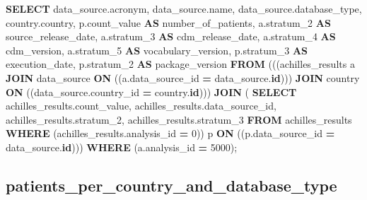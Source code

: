 \documentclass[
]{book}
\newenvironment{Shaded}{\begin{snugshade}}{\end{snugshade}}
\newcommand{\DecValTok}[1]{\textcolor[rgb]{0.00,0.00,0.81}{#1}}
\newcommand{\KeywordTok}[1]{\textcolor[rgb]{0.13,0.29,0.53}{\textbf{#1}}}
\newcommand{\NormalTok}[1]{#1}
\newcommand{\OperatorTok}[1]{\textcolor[rgb]{0.81,0.36,0.00}{\textbf{#1}}}
\begin{document}
\begin{Shaded}
\begin{Highlighting}[]
\KeywordTok{SELECT}\NormalTok{ data\_source.acronym,}
\NormalTok{   data\_source.name,}
\NormalTok{   data\_source.database\_type,}
\NormalTok{   country.country,}
\NormalTok{   p.count\_value }\KeywordTok{AS}\NormalTok{ number\_of\_patients,}
\NormalTok{   a.stratum\_2 }\KeywordTok{AS}\NormalTok{ source\_release\_date,}
\NormalTok{   a.stratum\_3 }\KeywordTok{AS}\NormalTok{ cdm\_release\_date,}
\NormalTok{   a.stratum\_4 }\KeywordTok{AS}\NormalTok{ cdm\_version,}
\NormalTok{   a.stratum\_5 }\KeywordTok{AS}\NormalTok{ vocabulary\_version,}
\NormalTok{   p.stratum\_3 }\KeywordTok{AS}\NormalTok{ execution\_date,}
\NormalTok{   p.stratum\_2 }\KeywordTok{AS}\NormalTok{ package\_version}
  \KeywordTok{FROM}\NormalTok{ (((achilles\_results a}
    \KeywordTok{JOIN}\NormalTok{ data\_source }\KeywordTok{ON}\NormalTok{ ((a.data\_source\_id }\OperatorTok{=}\NormalTok{ data\_source.}\KeywordTok{id}\NormalTok{)))}
    \KeywordTok{JOIN}\NormalTok{ country }\KeywordTok{ON}\NormalTok{ ((data\_source.country\_id }\OperatorTok{=}\NormalTok{ country.}\KeywordTok{id}\NormalTok{)))}
    \KeywordTok{JOIN}\NormalTok{ ( }\KeywordTok{SELECT}\NormalTok{ achilles\_results.count\_value,}
\NormalTok{           achilles\_results.data\_source\_id,}
\NormalTok{           achilles\_results.stratum\_2,}
\NormalTok{           achilles\_results.stratum\_3}
          \KeywordTok{FROM}\NormalTok{ achilles\_results}
         \KeywordTok{WHERE}\NormalTok{ (achilles\_results.analysis\_id }\OperatorTok{=} \DecValTok{0}\NormalTok{)) p }\KeywordTok{ON}\NormalTok{ ((p.data\_source\_id }\OperatorTok{=}\NormalTok{ data\_source.}\KeywordTok{id}\NormalTok{)))}
 \KeywordTok{WHERE}\NormalTok{ (a.analysis\_id }\OperatorTok{=} \DecValTok{5000}\NormalTok{);}
\end{Highlighting}
\end{Shaded}

\hypertarget{patients_per_country_and_database_type}{%
\subsection*{patients\_per\_country\_and\_database\_type}\label{patients_per_country_and_database_type}}
\end{document}

